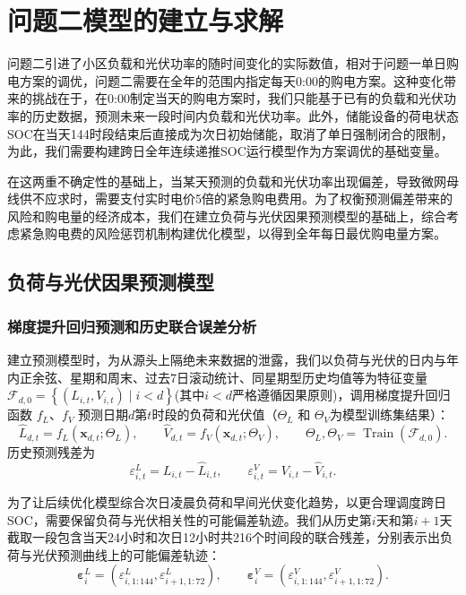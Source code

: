 \documentclass{cumcm2026}
\begin{document}
\section{问题二模型的建立与求解}
问题二引进了小区负载和光伏功率的随时间变化的实际数值，相对于问题一单日购电方案的调优，问题二需要在全年的范围内指定每天0:00的购电方案。这种变化带来的挑战在于，在0:00制定当天的购电方案时，我们只能基于已有的负载和光伏功率的历史数据，预测未来一段时间内负载和光伏功率。此外，储能设备的荷电状态SOC在当天144时段结束后直接成为次日初始储能，取消了单日强制闭合的限制，为此，我们需要构建跨日全年连续递推SOC运行模型作为方案调优的基础变量。

在这两重不确定性的基础上，当某天预测的负载和光伏功率出现偏差，导致微网母线供不应求时，需要支付实时电价5倍的紧急购电费用。为了权衡预测偏差带来的风险和购电量的经济成本，我们在建立负荷与光伏因果预测模型的基础上，综合考虑紧急购电费的风险惩罚机制构建优化模型，以得到全年每日最优购电量方案。
\subsection{负荷与光伏因果预测模型}

\subsubsection{梯度提升回归预测和历史联合误差分析}

建立预测模型时，为从源头上隔绝未来数据的泄露\cite{camacho2007model}，我们以负荷与光伏的日内与年内正余弦、星期和周末、过去7日滚动统计、同星期型历史均值等为特征变量\(\mathcal F_{d,0}
=\left\{(L_{i,t},V_{i,t})\mid i<d\right\}\)(其中$i<d$严格遵循因果原则)，调用梯度提升回归函数 $f_L$、$f_V$ 预测日期$d$第$t$时段的负荷和光伏值（$\Theta_L$ 和 $\Theta_V$为模型训练集结果）：
$$
\widehat L_{d,t}=f_L(\mathbf x_{d,t};\Theta_L),\qquad
\widehat V_{d,t}=f_V(\mathbf x_{d,t};\Theta_V),\qquad
\Theta_L,\Theta_V=\operatorname{Train}(\mathcal F_{d,0}).
$$
历史预测残差为$$
\varepsilon^L_{i,t}=L_{i,t}-\widehat L_{i,t},\qquad
\varepsilon^V_{i,t}=V_{i,t}-\widehat V_{i,t}.
$$

为了让后续优化模型综合次日凌晨负荷和早间光伏变化趋势，以更合理调度跨日SOC，需要保留负荷与光伏相关性的可能偏差轨迹。我们从历史第$i$天和第$i+1$天截取一段包含当天24小时和次日12小时共216个时间段的联合残差，分别表示出负荷与光伏预测曲线上的可能偏差轨迹：
$$
\boldsymbol\varepsilon^L_i
=\left(\varepsilon^L_{i,1:144},\varepsilon^L_{i+1,1:72}\right),\qquad
\boldsymbol\varepsilon^V_i
=\left(\varepsilon^V_{i,1:144},\varepsilon^V_{i+1,1:72}\right).
$$
\end{document}
